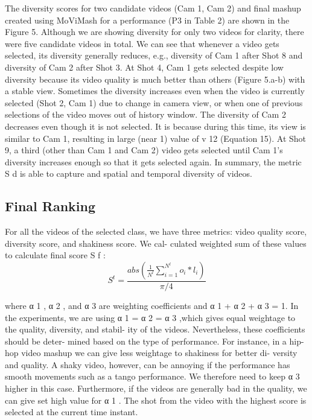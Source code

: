 \documentclass{sig-alternate}
\begin{document}
\par The diversity scores for two candidate videos (Cam 1, Cam 2)
and final mashup created using MoViMash for a performance (P3
in Table 2) are shown in the Figure 5. Although we are showing
diversity for only two videos for clarity, there were five candidate
videos in total. We can see that whenever a video gets selected,
its diversity generally reduces, e.g., diversity of Cam 1 after Shot 8
and diversity of Cam 2 after Shot 3. At Shot 4, Cam 1 gets selected
despite low diversity because its video quality is much better than
others (Figure 5.a-b) with a stable view. Sometimes the diversity
increases even when the video is currently selected (Shot 2, Cam 1)
due to change in camera view, or when one of previous selections
of the video moves out of history window. The diversity of Cam 2
decreases even though it is not selected. It is because during this
time, its view is similar to Cam 1, resulting in large (near 1) value
of v 12 (Equation 15). At Shot 9, a third (other than Cam 1 and Cam
2) video gets selected until Cam 1’s diversity increases enough so
that it gets selected again. In summary, the metric S d is able to
capture and spatial and temporal diversity of videos.

\subsection{Final Ranking}
For all the videos of the selected class, we have three metrics:
video quality score, diversity score, and shakiness score. We cal-
culated weighted sum of these values to calculate final score S f :
   \begin{equation}
              S^t = \frac{abs(\frac{1}{N^l}\sum_{i=1}^{N^l}o_{i}*l_{i})}{\pi/4}
       \end{equation}

where α 1 , α 2 , and α 3 are weighting coefficients and α 1 + α 2 +
α 3 = 1. In the experiments, we are using α 1 = α 2 = α 3 ,which gives equal weightage to the quality, diversity, and stabil-
ity of the videos. Nevertheless, these coefficients should be deter-
mined based on the type of performance. For instance, in a hip-hop
video mashup we can give less weightage to shakiness for better di-
versity and quality. A shaky video, however, can be annoying if the
performance has smooth movements such as a tango performance.
We therefore need to keep α 3 higher in this case. Furthermore, if
the videos are generally bad in the quality, we can give set high
value for α 1 . The shot from the video with the highest score is
selected at the current time instant.
\end{document}

